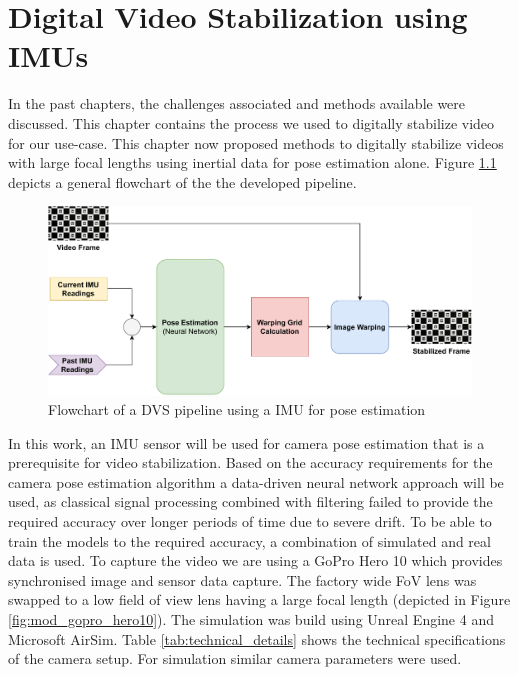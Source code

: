 \chapter{Digital Video Stabilization using IMUs} \label{chapter_four}

In the past chapters, the challenges associated and methods available were discussed. This chapter contains the process we used to digitally stabilize video for our use-case. This chapter now proposed methods to digitally stabilize videos with large focal lengths using inertial data for pose estimation alone. Figure \ref{fig:dis_pipeline} depicts a general flowchart of the the developed pipeline.


\begin{figure}[H]
    \includegraphics[scale=0.65]{images/fig_chapter4/dis_pipleline.pdf}
    \caption{Flowchart of a DVS pipeline using a IMU for pose estimation}
    \label{fig:dis_pipeline}
\end{figure}

In this work, an IMU sensor will be used for camera pose estimation that is a prerequisite for video stabilization. Based on the accuracy requirements for the camera pose estimation algorithm a data-driven neural network approach will be used, as classical signal processing combined with filtering failed to provide the required accuracy over longer periods of time due to severe drift. To be able to train the models to the required accuracy, a combination of simulated and real data is used. To capture the video we are using a GoPro Hero 10 which provides synchronised image and sensor data capture. The factory wide FoV lens was swapped to a low field of view lens having a large focal length (depicted in Figure \ref{fig:mod_gopro_hero10}). The simulation was build using Unreal Engine 4 and Microsoft AirSim. Table \ref{tab:technical_details} shows the technical specifications of the camera setup. For simulation similar camera parameters were used.

